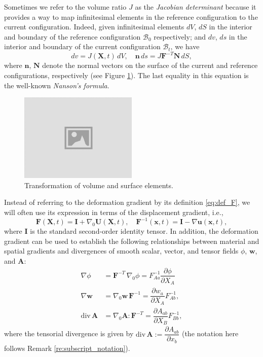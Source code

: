 \documentclass{sfuthesis}
\numberwithin{equation}{section}
\numberwithin{figure}{chapter}
\numberwithin{table}{chapter}
\theoremstyle{definition}
\def\*#1{{\mathbf{#1}}} %
\newcommand{\pder}[2]{\dfrac{\partial #1}{\partial #2}}
\newcommand{\divt}[1]{{\bm{\mathrm{div}} \, #1}}
\newcommand{\B}{\mathcal{B}}
\begin{document}
Sometimes we refer to the volume ratio $J$ as the \textit{Jacobian determinant} because it provides a way to map infinitesimal elements in the reference configuration to the current configuration. Indeed, given infinitesimal elements $dV$, $dS$ in the interior and boundary of the reference configuration $\B_0$ respectively; and $dv$, $ds$ in the interior and boundary of the current configuration $\B_t$, we have 
\begin{equation} \label{eq:differentials}
dv = J(\*X,t) \, dV, \quad \*n \, ds = J \*F^{-T} \*N \, dS, 
\end{equation}
where $\*n$, $\*N$ denote the normal vectors on the surface of the current and reference configurations, respectively (see Figure \ref{fig:potato_dv_ds}). The last equality in this equation is the well-known \textit{Nanson's formula}.

\begin{figure}
    \centering
    \includegraphics[width=0.5\textwidth]{placeholder-img.jpg}
    \caption{Transformation of volume and surface elements.\label{fig:potato_dv_ds}}
\end{figure}

Instead of referring to the deformation gradient by its definition \eqref{eq:def_F}, we will often use its expression in terms of the displacement gradient, i.e.,
\begin{equation} \label{eq:real_def_of_F}
\*F(\*X,t) = \*I + \nabla_0 \*U(\*X,t) , \quad \*F^{-1}(\*x,t) = \*I - \nabla \*u(\*x,t),
\end{equation}
where $\*I$ is the standard second-order identity tensor. In addition, the deformation gradient can be used to establish the following relationships between material and spatial gradients and divergences of smooth scalar, vector, and tensor fields $\phi$, $\*w$, and $\*A$:
\begin{align}
\nabla \phi &= \*F^{-T} \, \nabla_0 \phi = F^{-1}_{Aa} \pder{\phi}{X_A} \\
\label{eq:transform_2}\nabla \*w &= \nabla_0 \*w \, \*F^{-1} = \pder{w_a}{X_A} F^{-1}_{Ab}, \\
\label{eq:transform_3}\divt{\*A} &= \nabla_0 \*A : \*F^{-T} = \pder{A_{ab}}{X_B} F^{-1}_{Bb},
\end{align}
where the tensorial divergence is given by $\divt{\*A} := \pder{A_{ab}}{x_b}$ (the notation here follows Remark \ref{re:subscript_notation}).
\end{document}
